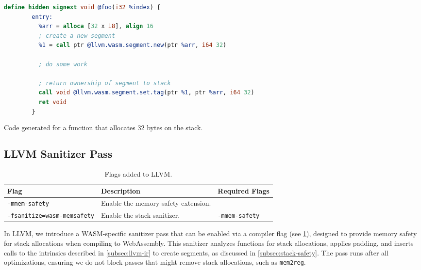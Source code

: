 \begin{lstfloat}
    \begin{lstlisting}[frame=h,style=customc,
        label={lst:llvm-intrinsics},language=llvm]
        define hidden signext void @foo(i32 %index) {
        entry:
          %arr = alloca [32 x i8], align 16
          ; create a new segment
          %1 = call ptr @llvm.wasm.segment.new(ptr %arr, i64 32)

          ; do some work

          ; return ownership of segment to stack
          call void @llvm.wasm.segment.set.tag(ptr %1, ptr %arr, i64 32)
          ret void
        }
    \end{lstlisting}
    \caption{Code generated for a function that allocates 32 bytes on the stack.}
    \label{lst:llvm-intrinsics-float}
\end{lstfloat}

\subsection{LLVM Sanitizer Pass}
\label{subsec:llvm-sanitizer-pass}

\begin{table}[h]
    \centering
    \caption{Flags added to LLVM.}
    \label{tab:llvm-flags}
    \begin{tabular}{l | l | l}
        \textbf{Flag}                      & \textbf{Description}                & \textbf{Required Flags} \\
        \hline
        \texttt{-mmem-safety}              & Enable the memory safety extension. &                         \\
        \texttt{-fsanitize=wasm-memsafety} & Enable the stack sanitizer.         & \texttt{-mmem-safety}   \\
    \end{tabular}
\end{table}

In LLVM, we introduce a \ac{WASM}-specific sanitizer pass that can be enabled via a compiler flag (see \cref{tab:llvm-flags}), designed to provide memory safety for stack allocations when compiling to WebAssembly.
This sanitizer analyzes functions for stack allocations, applies padding, and inserts calls to the intrinsics described in \cref{subsec:llvm-ir} to create segments, as discussed in \cref{subsec:stack-safety}.
The pass runs after all optimizations, ensuring we do not block passes that might remove stack allocations, such as \texttt{mem2reg}.

